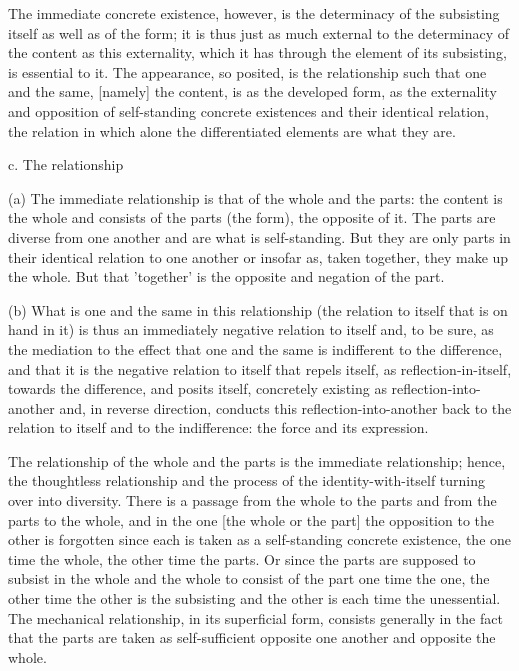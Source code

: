 The immediate concrete existence, however, is
the determinacy of the subsisting itself as well as of the form;
it is thus just as much external to the determinacy of the content
as this externality, which it has through the element of its subsisting,
is essential to it.
The appearance, so posited, is the relationship
such that one and the same, [namely] the content, is
as the developed form, as the externality and opposition of
self-standing concrete existences and their identical relation,
the relation in which alone the differentiated elements are what they are.

c. The relationship

(a) The immediate relationship is that of the whole and the parts:
the content is the whole and consists of the parts (the form),
the opposite of it.
The parts are diverse from one another
and are what is self-standing.
But they are only parts in their identical relation to one another
or insofar as, taken together, they make up the whole.
But that 'together' is the opposite and negation of the part.

(b) What is one and the same in this relationship
(the relation to itself that is on hand in it)
is thus an immediately negative relation to itself and,
to be sure, as the mediation to the effect that one and the same
is indifferent to the difference, and that
it is the negative relation to itself that repels itself,
as reflection-in-itself, towards the difference, and posits itself,
concretely existing as reflection-into-another and, in reverse direction,
conducts this reflection-into-another back to
the relation to itself and to the indifference:
the force and its expression.

    The relationship of the whole and the parts is
    the immediate relationship;
    hence, the thoughtless relationship
    and the process of the identity-with-itself
    turning over into diversity.
    There is a passage from the whole to the parts and
    from the parts to the whole,
    and in the one [the whole or the part]
    the opposition to the other is forgotten since
    each is taken as a self-standing concrete existence,
    the one time the whole, the other time the parts.
    Or since the parts are supposed to subsist in the whole
    and the whole to consist of the part one time the one,
    the other time the other is the subsisting and
    the other is each time the unessential.
    The mechanical relationship,
    in its superficial form,
    consists generally in the fact
    that the parts are taken as self-sufficient
    opposite one another and opposite the whole.

